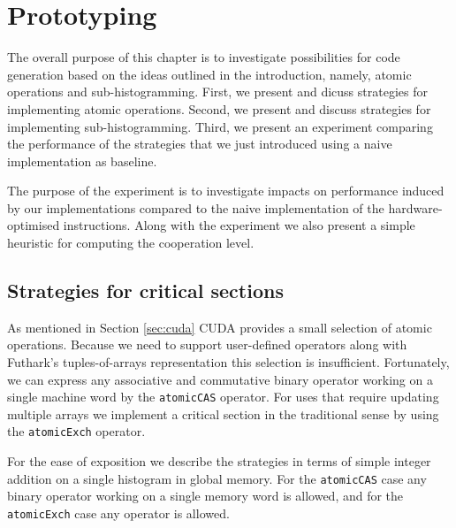 \chapter{Prototyping}
\label{chap:prototyping}

The overall purpose of this chapter is to investigate
possibilities for code generation based on the ideas
outlined in the introduction, namely, atomic operations and
sub-histogramming. First, we present and dicuss strategies
for implementing atomic operations. Second, we present and
discuss strategies for implementing sub-histogramming.
Third, we present an experiment comparing the performance of
the strategies that we just introduced using a naive
implementation as baseline.

The purpose of the experiment is to investigate impacts on
performance induced by our implementations compared to the
naive implementation of the hardware-optimised
instructions. Along with the experiment we also present a
simple heuristic for computing the cooperation level. 


\section{Strategies for critical sections}
\label{sec:critical_sections}

As mentioned in Section \ref{sec:cuda} CUDA provides a small
selection of atomic operations. Because we need to support
user-defined operators along with Futhark's tuples-of-arrays
representation this selection is insufficient. Fortunately,
we can express any associative and commutative binary
operator working on a single machine word by the
\texttt{atomicCAS} operator. For uses that require updating
multiple arrays we implement a critical section in the
traditional sense by using the \texttt{atomicExch} operator. 

For the ease of exposition we describe the strategies in
terms of simple integer addition on a single histogram in
global memory. For the \texttt{atomicCAS} case any binary
operator working on a single memory word is allowed, and for
the \texttt{atomicExch} case any operator is
allowed. 

